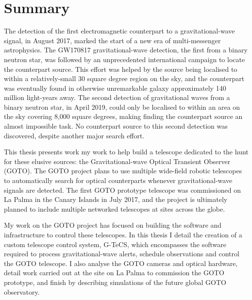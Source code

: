 \chapter*{Summary}

\begin{onehalfspace}

The detection of the first electromagnetic counterpart to a gravitational-wave signal, in August 2017, marked the start of a new era of multi-messenger astrophysics. The GW170817 gravitational-wave detection, the first from a binary neutron star, was followed by an unprecedented international campaign to locate the counterpart source. This effort was helped by the source being localised to within a relatively-small 30 square degree region on the sky, and the counterpart was eventually found in otherwise unremarkable galaxy approximately 140 million light-years away. The second detection of gravitational waves from a binary neutron star, in April 2019, could only be localised to within an area on the sky covering 8,000 square degrees, making finding the counterpart source an almost impossible task. No counterpart source to this second detection was discovered, despite another major search effort.

This thesis presents work my work to help build a telescope dedicated to the hunt for these elusive sources: the Gravitational-wave Optical Transient Observer (GOTO). The GOTO project plans to use multiple wide-field robotic telescopes to automatically search for optical counterparts whenever gravitational-wave signals are detected. The first GOTO prototype telescope was commissioned on La Palma in the Canary Islands in July 2017, and the project is ultimately planned to include multiple networked telescopes at sites across the globe.

My work on the GOTO project has focused on building the software and infrastructure to control these telescopes. In this thesis I detail the creation of a custom telescope control system, G-TeCS, which encompasses the software required to process gravitational-wave alerts, schedule observations and control the GOTO telescope. I also analyse the GOTO cameras and optical hardware, detail work carried out at the site on La Palma to commission the GOTO prototype, and finish by describing simulations of the future global GOTO observatory.

\end{onehalfspace}
